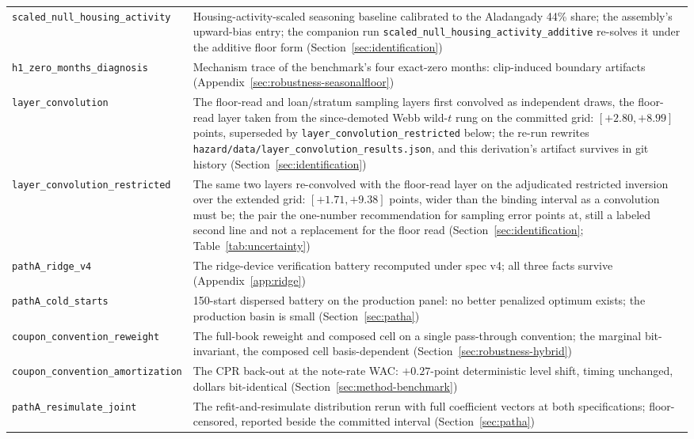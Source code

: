 \documentclass[12pt]{article}
\begin{document}
{\begin{longtable}{@{}p{5.4cm}p{8.8cm}@{}}
\texttt{scaled\_null\_housing\_activity} & Housing-activity-scaled seasoning baseline calibrated to the Aladangady 44\% share; the assembly's upward-bias entry; the companion run \texttt{scaled\_null\_housing\_activity\_additive} re-solves it under the additive floor form (Section~\ref{sec:identification}) \\
\texttt{h1\_zero\_months\_diagnosis} & Mechanism trace of the benchmark's four exact-zero months: clip-induced boundary artifacts (Appendix~\ref{sec:robustness-seasonalfloor}) \\
\texttt{layer\_convolution} & The floor-read and loan/stratum sampling layers first convolved as independent draws, the floor-read layer taken from the since-demoted Webb wild-$t$ rung on the committed grid: $[+2.80, +8.99]$ points, superseded by \texttt{layer\_convolution\_restricted} below; the re-run rewrites \texttt{hazard/data/layer\_convolution\_results.json}, and this derivation's artifact survives in git history (Section~\ref{sec:identification}) \\
\texttt{layer\_convolution\_restricted} & The same two layers re-convolved with the floor-read layer on the adjudicated restricted inversion over the extended grid: $[+1.71, +9.38]$ points, wider than the binding interval as a convolution must be; the pair the one-number recommendation for sampling error points at, still a labeled second line and not a replacement for the floor read (Section~\ref{sec:identification}; Table~\ref{tab:uncertainty}) \\
\texttt{pathA\_ridge\_v4} & The ridge-device verification battery recomputed under spec v4; all three facts survive (Appendix~\ref{app:ridge}) \\
\texttt{pathA\_cold\_starts} & 150-start dispersed battery on the production panel: no better penalized optimum exists; the production basin is small (Section~\ref{sec:patha}) \\
\texttt{coupon\_convention\_reweight} & The full-book reweight and composed cell on a single pass-through convention; the marginal bit-invariant, the composed cell basis-dependent (Section~\ref{sec:robustness-hybrid}) \\
\texttt{coupon\_convention\_amortization} & The CPR back-out at the note-rate WAC: $+0.27$-point deterministic level shift, timing unchanged, dollars bit-identical (Section~\ref{sec:method-benchmark}) \\
\texttt{pathA\_resimulate\_joint} & The refit-and-resimulate distribution rerun with full coefficient vectors at both specifications; floor-censored, reported beside the committed interval (Section~\ref{sec:patha}) \\

\end{longtable}}
\end{document}
